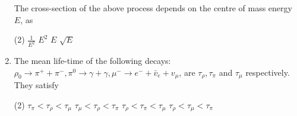 \begin{enumerate}
$$$$
The cross-section of the above process depends on the centre of mass energy $E$, as
 \begin{tasks}(2)
	\task[\textbf{a.}]$\frac{1}{E^{2}}$
	\task[\textbf{b.}]$E^{2}$
	\task[\textbf{c.}]$E$
	\task[\textbf{d.}]$\sqrt{E}$ 
\end{tasks}
\item  The mean life-time of the following decays:\\
$\rho_{0} \rightarrow \pi^{+}+\pi^{-}, \pi^{0} \rightarrow \gamma+\gamma, \mu^{-} \rightarrow e^{-}+\bar{v}_{e}+v_{\mu}$, are $\tau_{\rho}, \tau_{\pi}$ and $\tau_{\mu}$ respectively.
They satisfy
 \begin{tasks}(2)
	\task[\textbf{a.}]$\tau_{\pi}<\tau_{\rho}<\tau_{\mu}$
	\task[\textbf{b.}]$\tau_{\mu}<\tau_{\rho}<\tau_{\pi}$
	\task[\textbf{c.}]$\tau_{\rho}<\tau_{\pi}<\tau_{\mu}$
	\task[\textbf{d.}]$\tau_{\rho}<\tau_{\mu}<\tau_{\pi}$ 
\end{tasks}
\end{enumerate}